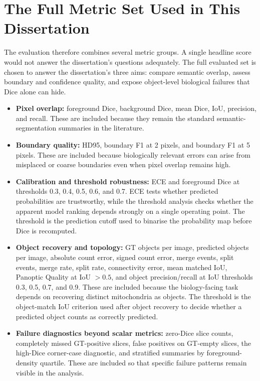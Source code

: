 \documentclass[logo,bsc,singlespacing,parskip,online]{infthesis}
\begin{document}
\section{The Full Metric Set Used in This Dissertation}

The evaluation therefore combines several metric groups. A single headline
score would not answer the dissertation's questions adequately. The full
evaluated set is chosen to answer
the dissertation's three aims: compare semantic overlap, assess boundary and
confidence quality, and expose object-level biological failures that Dice alone
can hide.

\begin{itemize}
\item \textbf{Pixel overlap:} foreground Dice, background Dice, mean Dice, IoU,
precision, and recall. These are included because they remain the standard
semantic-segmentation summaries in the literature. 

\item \textbf{Boundary quality:} HD95, boundary F1 at 2 pixels, and boundary F1
at 5 pixels. These are included because biologically relevant errors can arise
from misplaced or coarse boundaries even when pixel overlap remains high.

\item \textbf{Calibration and threshold robustness:} ECE and foreground Dice at
thresholds 0.3, 0.4, 0.5, 0.6, and 0.7. ECE tests whether predicted
probabilities are trustworthy, while the threshold analysis checks whether the
apparent model ranking depends strongly on a single operating point. The
threshold is the prediction cutoff used to binarise the probability map before
Dice is recomputed.

\item \textbf{Object recovery and topology:} GT objects per image, predicted
objects per image, absolute count error, signed count error, merge events,
split events, merge rate, split rate, connectivity error, mean matched IoU,
Panoptic Quality at IoU $> 0.5$, and object precision/recall at IoU thresholds
0.3, 0.5, 0.7, and 0.9. These are
included because the biology-facing task depends on recovering distinct
mitochondria as objects. The threshold is the
object-match IoU criterion used after object recovery to decide whether a
predicted object counts as correctly predicted.


\item \textbf{Failure diagnostics beyond scalar metrics:} zero-Dice slice
counts, completely missed GT-positive slices, false positives on GT-empty
slices, the high-Dice corner-case diagnostic, and stratified summaries by
foreground-density quartile. These are included so that specific failure
patterns remain visible in the analysis.
\end{itemize}
\end{document}
